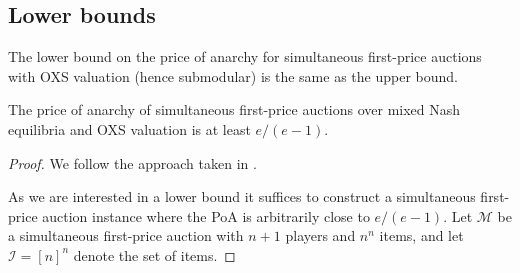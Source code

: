 \subsection{Lower bounds} %
\label{sub:Lower bounds}
The lower bound on the price of anarchy for simultaneous first-price auctions with OXS valuation (hence submodular) is the same as the upper bound.
\begin{theorem}
  The price of anarchy of simultaneous first-price auctions over mixed Nash equilibria and OXS valuation is at least $ e /(e-1) $.
\end{theorem}
\begin{proof}
  We follow the approach taken in \cite[Theorem 3.4]{Christodoulou2016TightBounds}.

  As we are interested in a lower bound it suffices to construct a simultaneous first-price auction instance where the PoA is arbitrarily close to $ e /(e-1) $. Let $ \mathcal{M} $ be a simultaneous first-price auction with $ n+1 $ players and $ n^{n} $ items, and let $ \mathcal{I}=[n]^{n} $ denote the set of items.


\end{proof}
